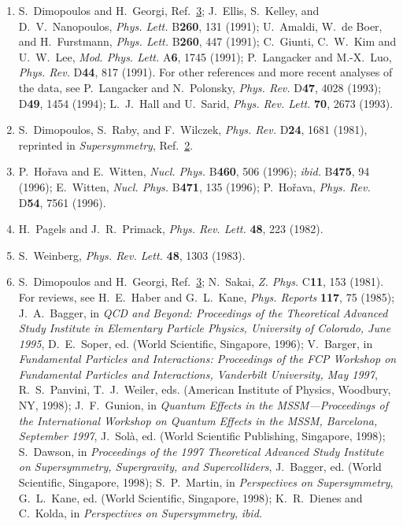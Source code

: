 \begin{enumerate}
  \item {}\label{ch28-ref-6}
  S.~Dimopoulos and H.~Georgi, Ref.~\hyperref[ch28-ref-3]{3};
  J.~Ellis, S.~Kelley, and D.~V.~Nanopoulos, \textit{Phys. Lett.}
  B\textbf{260}, 131 (1991); U.~Amaldi, W.~de Boer, and H.~Furstmann,
  \textit{Phys. Lett.} B\textbf{260}, 447 (1991); C.~Giunti,
  C.~W.~Kim and U.~W.~Lee, \textit{Mod. Phys. Lett.} A\textbf{6}, 1745
  (1991); P.~Langacker and M.-X.~Luo, \textit{Phys. Rev.} D\textbf{44},
  817 (1991). For other references and more recent analyses of the data,
  see P.~Langacker and N.~Polonsky, \textit{Phys. Rev.} D\textbf{47},
  4028 (1993); D\textbf{49}, 1454 (1994); L.~J.~Hall and U.~Sarid,
  \textit{Phys. Rev. Lett.} \textbf{70}, 2673 (1993).

  \item {}\label{ch28-ref-7}
  S.~Dimopoulos, S.~Raby, and F.~Wilczek, \textit{Phys. Rev.}
  D\textbf{24}, 1681 (1981), reprinted in \textit{Supersymmetry},
  Ref.~\hyperref[ch28-ref-2]{2}.

  \item[7a.] \label{ch28-ref-7a}
  P.~Ho\v{r}ava and E.~Witten, \textit{Nucl. Phys.} B\textbf{460}, 506
  (1996); \textit{ibid.} B\textbf{475}, 94 (1996); E.~Witten,
  \textit{Nucl. Phys.} B\textbf{471}, 135 (1996); P.~Ho\v{r}ava,
  \textit{Phys. Rev.} D\textbf{54}, 7561 (1996).

  \item {}\label{ch28-ref-8}
  H.~Pagels and J.~R.~Primack, \textit{Phys. Rev. Lett.} \textbf{48},
  223 (1982).

  \item {}\label{ch28-ref-9}
  S.~Weinberg, \textit{Phys. Rev. Lett.} \textbf{48}, 1303 (1983).

  \item {}\label{ch28-ref-10}
  S.~Dimopoulos and H.~Georgi, Ref.~\hyperref[ch28-ref-3]{3};
  N.~Sakai, \textit{Z. Phys.} C\textbf{11}, 153 (1981). For reviews,
  see H.~E.~Haber and G.~L.~Kane, \textit{Phys. Reports} \textbf{117},
  75 (1985); J.~A.~Bagger, in \textit{QCD and Beyond: Proceedings of
  the Theoretical Advanced Study Institute in Elementary Particle
  Physics, University of Colorado, June 1995}, D.~E.~Soper, ed. (World
  Scientific, Singapore, 1996); V.~Barger, in \textit{Fundamental
  Particles and Interactions: Proceedings of the FCP Workshop on
  Fundamental Particles and Interactions, Vanderbilt University, May
  1997}, R.~S.~Panvini, T.~J.~Weiler, eds. (American Institute of
  Physics, Woodbury, NY, 1998); J.~F.~Gunion, in \textit{Quantum
  Effects in the MSSM---Proceedings of the International Workshop on
  Quantum Effects in the MSSM, Barcelona, September 1997}, J.~Sol\`a,
  ed. (World Scientific Publishing, Singapore, 1998); S.~Dawson, in
  \textit{Proceedings of the 1997 Theoretical Advanced Study Institute
  on Supersymmetry, Supergravity, and Supercolliders}, J.~Bagger, ed.
  (World Scientific, Singapore, 1998); S.~P.~Martin, in
  \textit{Perspectives on Supersymmetry}, G.~L.~Kane, ed. (World
  Scientific, Singapore, 1998); K.~R.~Dienes and C.~Kolda, in
  \textit{Perspectives on Supersymmetry}, \textit{ibid.}


\end{enumerate}
